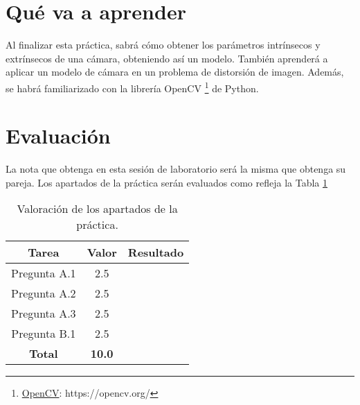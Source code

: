 \section{Qué va a aprender}

Al finalizar esta práctica, sabrá cómo obtener los parámetros intrínsecos y extrínsecos de una cámara, obteniendo así un modelo. También aprenderá a aplicar un modelo de cámara en un problema de distorsión de imagen. Además, se habrá familiarizado con la librería OpenCV \footnote{\href{https://opencv.org/}{OpenCV}: https://opencv.org/} de Python.

\section{Evaluación}
La nota que obtenga en esta sesión de laboratorio será la misma que obtenga su pareja. Los apartados de la práctica serán evaluados como refleja la Tabla \ref{table:evaluacion}


\begin{table}[h!]
    \centering
    \begin{tabular}{|c|c|c|}
    \hline
    \textbf{Tarea} & \textbf{Valor} & \textbf{Resultado} \\ \hline
    Pregunta A.1 & 2.5 & \\ \hline
    Pregunta A.2 & 2.5 & \\ \hline
    Pregunta A.3 & 2.5 & \\ \hline
    Pregunta B.1 & 2.5 & \\ \hline
    \textbf{Total} & \textbf{10.0} & \\ \hline
    \end{tabular}
    \caption{Valoración de los apartados de la práctica.}
    \label{table:evaluacion}
\end{table}